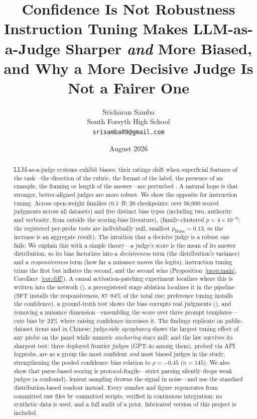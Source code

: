 \documentclass[11pt]{article}
\title{\textbf{Confidence Is Not Robustness}\\[2pt]
\large Instruction Tuning Makes LLM-as-a-Judge Sharper \emph{and} More Biased,\\
and Why a More Decisive Judge Is Not a Fairer One}
\author{Sricharan Samba\\
\small South Forsyth High School \\
\small \texttt{srisamba09@gmail.com}}
\date{August 2026}
\begin{document}
\sloppy
\maketitle

\begin{abstract}\noindent
LLM-as-a-judge systems exhibit biases: their ratings shift when superficial features
of the task---the direction of the rubric, the format of the label, the presence of an
example, the framing or length of the answer---are perturbed
\citep{li2025scoring,ye2024justice}. A natural hope is that stronger, better-aligned
judges are more robust. We show the opposite for instruction tuning. Across \NFAM{}
open-weight families (0.1--\MAXB{}B; 26 checkpoints; over 56{,}000 scored judgments
across all datasets) and five
distinct bias types (including two, authority and verbosity, from outside the
scoring-bias literature),
\DECISIVESENTENCE{} \RESULTSENTENCE{} (family-clustered $p=4\times10^{-6}$; the registered per-probe tests are individually null,
smallest $p_{\text{Holm}}=0.13$, so the increase is an aggregate result). The intuition that a
decisive judge is a robust one fails: \LINKSENTENCE{} \PREDSENTENCE{} We explain this
with a simple theory---a judge's score is the mean of its answer distribution, so its
bias factorizes into a \emph{decisiveness} term (the distribution's variance) and a
\emph{responsiveness} term (how far a nuisance moves the logits); instruction tuning
trims the first but inflates the second, and the second wins
(Proposition~\ref{prop:main}, Corollary~\ref{cor:diff}). A causal activation-patching
experiment localizes where this is written into the network (\PATCHSENTENCE{}), a
preregistered stage ablation localizes it in the pipeline (SFT installs the
responsiveness, 87--94\% of the total rise; preference tuning installs the
confidence), a ground-truth test shows the bias corrupts real judgments
(\GOLDSENTENCE{}), and removing a nuisance dimension---ensembling the score over three
prompt templates---cuts bias by 22\% where raising confidence increases it. The findings replicate on public-dataset items and in Chinese; judge-side
\emph{sycophancy} shows the largest tuning effect of any probe on the panel while
numeric \emph{anchoring} stays null; and the law survives its sharpest test: three deployed
frontier judges (GPT-4o among them), probed via API logprobs, are as a group the most
confident \emph{and} most biased judges in the study, strengthening the pooled confidence--bias
relation to $\rho=-0.45$ ($n=145$). We also
show that parse-based scoring is protocol-fragile---strict parsing silently drops
weak judges (a confound), lenient sampling drowns the signal in noise---and use the
standard distribution-based readout instead. Every number and figure regenerates from committed raw files by committed scripts,
verified in continuous integration; no synthetic data is used, and a full audit of a
prior, fabricated version of this project is included.
\end{abstract}
\end{document}
